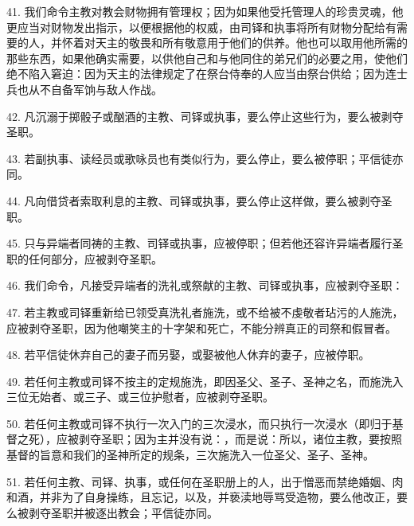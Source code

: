41. 我们命令主教对教会财物拥有管理权；因为如果他受托管理人的珍贵灵魂，他更应当对财物发出指示，以便根据他的权威，由司铎和执事将所有财物分配给有需要的人，并怀着对天主的敬畏和所有敬意用于他们的供养。他也可以取用他所需的那些东西，如果他确实需要，以供他自己和与他同住的弟兄们的必要之用，使他们绝不陷入窘迫：因为天主的法律规定了在祭台侍奉的人应当由祭台供给；因为连士兵也从不自备军饷与敌人作战。\par

42. 凡沉溺于掷骰子或酗酒的主教、司铎或执事，要么停止这些行为，要么被剥夺圣职。\par

43. 若副执事、读经员或歌咏员也有类似行为，要么停止，要么被停职；平信徒亦同。\par

44. 凡向借贷者索取利息的主教、司铎或执事，要么停止这样做，要么被剥夺圣职。\par

45. 只与异端者同祷的主教、司铎或执事，应被停职；但若他还容许异端者履行圣职的任何部分，应被剥夺圣职。\par

46. 我们命令，凡接受异端者的洗礼或祭献的主教、司铎或执事，应被剥夺圣职：\par

47. 若主教或司铎重新给已领受真洗礼者施洗，或不给被不虔敬者玷污的人施洗，应被剥夺圣职，因为他嘲笑主的十字架和死亡，不能分辨真正的司祭和假冒者。\par

48. 若平信徒休弃自己的妻子而另娶，或娶被他人休弃的妻子，应被停职。\par

49. 若任何主教或司铎不按主的定规施洗，即因圣父、圣子、圣神之名，而施洗入三位无始者、或三子、或三位护慰者，应被剥夺圣职。\par

50. 若任何主教或司铎不执行一次入门的三次浸水，而只执行一次浸水（即归于基督之死），应被剥夺圣职；因为主并没有说：，而是说：所以，诸位主教，要按照基督的旨意和我们的圣神所定的规条，三次施洗入一位圣父、圣子、圣神。\par

51. 若任何主教、司铎、执事，或任何在圣职册上的人，出于憎恶而禁绝婚姻、肉和酒，并非为了自身操练，且忘记，以及，并亵渎地辱骂受造物，要么他改正，要么被剥夺圣职并被逐出教会；平信徒亦同。\par

